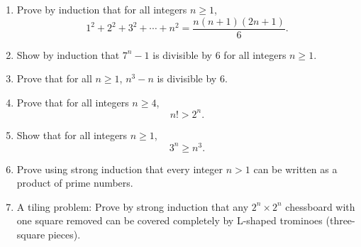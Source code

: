 \begin{enumerate}
\begin{enumerate}
One student in the class reasons as follows, by induction on $n = 5 - k$:
\begin{itemize}
	\item	The test cannot be on Friday (the last working day of the week, $k=5,n=0$), because if it hasn’t happened before then, the class would know it must be on Friday — and so it would not be a surprise.
	 \item	Similarly, the test cannot be on Thursday, because if it hasn’t happened before then, and Friday has already been ruled out, the class would know it must be on Thursday — and so it would not be a surprise.
	\item	Continuing this reasoning backwards, the test cannot be on Wednesday, Tuesday, or Monday either.
	\item	Therefore, the teacher cannot give a surprise test at all!
\end{itemize}
Yet, when Suban gives the test on Wednesday, the students are indeed surprised. Identify the flaw in the student's reasoning.

    
      \item Prove by induction that for all integers $n \geq 1$,
      \[
      1^2 + 2^2 + 3^2 + \cdots + n^2 = \frac{n(n+1)(2n+1)}{6}.
      \]
   

      \item Show by induction that $7^n - 1$ is divisible by $6$ for all integers $n \geq 1$.
      \item Prove that for all $n \geq 1$, $n^3 - n$ is divisible by $6$.

      \item Prove that for all integers $n \geq 4$, 
      \[
      n! > 2^n.
      \]
      \item Show that for all integers $n \geq 1$,
      \[
      3^n \geq n^3.
      \]


      \item Prove using strong induction that every integer $n > 1$ can be written as a product of prime numbers.
      \item A tiling problem: Prove by strong induction that any $2^n \times 2^n$ chessboard with one square removed can be covered completely by L-shaped trominoes (three-square pieces).
   
\end{enumerate}

\end{enumerate}

